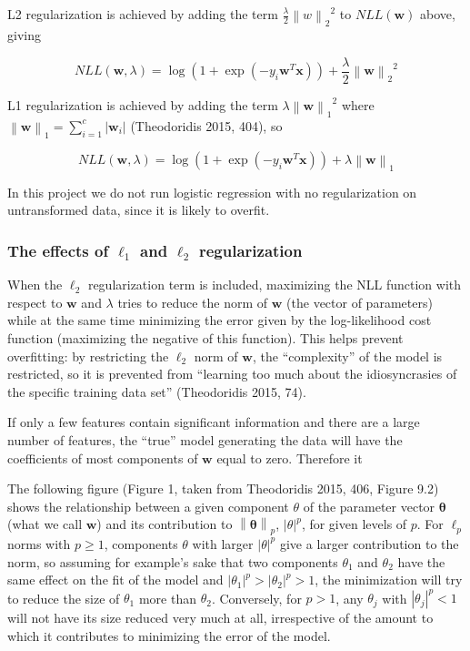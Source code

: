 \documentclass[letterpaper, 11pt]{article}
\newcommand{\norm}[1]{\left\lVert #1 \right\rVert}
\newcommand{\vect}[1]{\boldsymbol{#1}}
\begin{document}
L2 regularization is achieved by adding the term $\frac{\lambda}{2} {\norm{w}_2}^2$ to $NLL(\vect{w})$ above, giving

\begin{equation*}
  NLL(\vect{w}, \lambda) = \log(1 + \exp(-y_i \vect{w}^T\vect{x})) + \frac{\lambda}{2} {\norm{\vect{w}}_2}^2
\end{equation*}

L1 regularization is achieved by adding the term $\lambda {\norm{\vect{w}}_1}^2$ where $\norm{\vect{w}}_1 = \sum_{i=1}^{c} |\vect{w}_i|$ (Theodoridis 2015, 404), so

\begin{equation*}
  NLL(\vect{w}, \lambda) = \log(1 + \exp(-y_i \vect{w}^T\vect{x})) + \lambda {\norm{\vect{w}}_1}
\end{equation*}

In this project we do not run logistic regression with no regularization on untransformed data, since it is likely to overfit.

\subsubsection{The effects of $\ell_1$ and $\ell_2$ regularization}

When the $\ell_2$ regularization term is included, maximizing the NLL function with respect to $\vect{w}$ and $\lambda$ tries to reduce the norm of $\vect{w}$ (the vector of parameters) while at the same time minimizing the error given by the log-likelihood cost function (maximizing the negative of this function). This helps prevent overfitting: by restricting the $\ell_2$ norm of $\vect{w}$, the ``complexity'' of the model is restricted, so it is prevented from ``learning too much about the idiosyncrasies of the specific training data set'' (Theodoridis 2015, 74).

If only a few features contain significant information and there are a large number of features, the ``true'' model generating the data will have the coefficients of most components of $\vect{w}$ equal to zero. Therefore it 

The following figure (Figure 1, taken from Theodoridis 2015, 406, Figure 9.2) shows the relationship between a given component $\theta$ of the parameter vector $\vect{\theta}$ (what we call $\vect{w}$) and its contribution to $\norm{\vect{\theta}}_p$, $|\theta|^p$, for given levels of $p$. For $\ell_p$ norms with $p \geq 1$, components $\theta$ with larger $|\theta|^p$ give a larger contribution to the norm, so assuming for example's sake that two components $\theta_1$ and $\theta_2$ have the same effect on the fit of the model and $|\theta_1|^p > |\theta_2|^p > 1$, the minimization will try to reduce the size of $\theta_1$ more than $\theta_2$. Conversely, for $p > 1$, any $\theta_j$ with $|\theta_j|^p < 1$ will not have its size reduced very much at all, irrespective of the amount to which it contributes to minimizing the error of the model.
\end{document}
